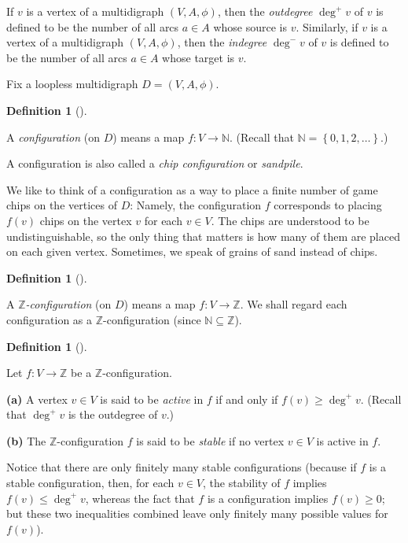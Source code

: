 \documentclass[numbers=enddot,12pt,final,onecolumn,notitlepage]{scrartcl}%
\theoremstyle{definition}
\newtheorem{defi}[theo]{Definition}
\newenvironment{definition}[1][]
{\begin{defi}[#1]\begin{leftbar}}
{\end{leftbar}\end{defi}}
\newcommand{\NN}{\mathbb{N}}
\newcommand{\ZZ}{\mathbb{Z}}
\newcommand{\set}[1]{\left\{ #1 \right\}}
\newcommand{\tup}[1]{\left( #1 \right)}
\begin{document}
If $v$ is a vertex of a multidigraph $\tup{V, A, \phi}$, then the
\textit{outdegree} $\deg^+ v$ of $v$ is defined to be the number
of all arcs $a \in A$ whose source is $v$.
Similarly,
if $v$ is a vertex of a multidigraph $\tup{V, A, \phi}$, then the
\textit{indegree} $\deg^- v$ of $v$ is defined to be the number
of all arcs $a \in A$ whose target is $v$.

Fix a loopless multidigraph $D = \tup{V, A, \phi}$.

\begin{definition}
A \textit{configuration} (on $D$) means a map $f : V \to \NN$.
(Recall that $\NN = \set{0, 1, 2, \ldots}$.)

A configuration is also called a \textit{chip configuration} or
\textit{sandpile}.

We like to think of a configuration as a way to place
a finite number of game chips on the vertices of $D$:
Namely, the configuration $f$ corresponds to placing
$f \tup{v}$ chips on the vertex $v$ for each $v \in V$.
The chips are understood to be undistinguishable, so the
only thing that matters is how many of them are placed on
each given vertex.
Sometimes, we speak of grains of sand instead of chips.
\end{definition}

\begin{definition}
A \textit{$\ZZ$-configuration} (on $D$) means a map
$f : V \to \ZZ$.
We shall regard each configuration as a $\ZZ$-configuration
(since $\NN \subseteq \ZZ$).
\end{definition}

\begin{definition}
Let $f : V \to \ZZ$ be a $\ZZ$-configuration.

\textbf{(a)} A vertex $v \in V$ is said to be
\textit{active} in $f$ if and only if
$f\tup{v} \geq \deg^+ v$.
(Recall that $\deg^+ v$ is the outdegree of $v$.)

\textbf{(b)} The $\ZZ$-configuration $f$ is said to be
\textit{stable} if no vertex $v \in V$ is active in $f$.
\end{definition}

Notice that there are only finitely many stable configurations
(because if $f$ is a stable configuration, then, for each
$v \in V$, the stability of $f$ implies $f \tup{v} \leq \deg^+ v$,
whereas the fact that $f$ is a configuration implies
$f \tup{v} \geq 0$; but these two inequalities combined
leave only finitely many possible values for $f \tup{v}$).
\end{document}
